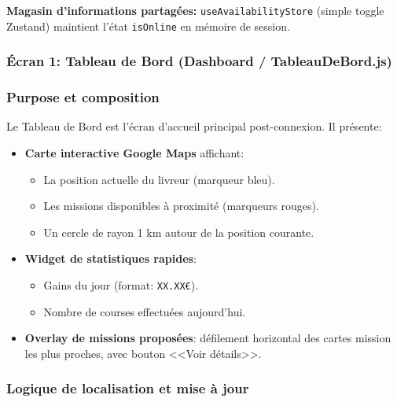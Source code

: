 \textbf{Magasin d'informations partagées:} \texttt{useAvailabilityStore} (simple toggle Zustand) maintient l'état \texttt{isOnline} en mémoire de session.

\subsubsection{Écran 1: Tableau de Bord (Dashboard / TableauDeBord.js)}

\subsubsection{Purpose et composition}

Le Tableau de Bord est l'écran d'accueil principal post-connexion. Il présente:

\begin{itemize}
    \item \textbf{Carte interactive Google Maps} affichant:
    \begin{itemize}
        \item La position actuelle du livreur (marqueur bleu).
        \item Les missions disponibles à proximité (marqueurs rouges).
        \item Un cercle de rayon 1 km autour de la position courante.
    \end{itemize}
    \item \textbf{Widget de statistiques rapides}:
    \begin{itemize}
        \item Gains du jour (format: \texttt{XX.XX€}).
        \item Nombre de courses effectuées aujourd'hui.
    \end{itemize}
    \item \textbf{Overlay de missions proposées}: défilement horizontal des cartes mission les plus proches, avec bouton <<Voir détails>>.
\end{itemize}

\subsubsection{Logique de localisation et mise à jour}

